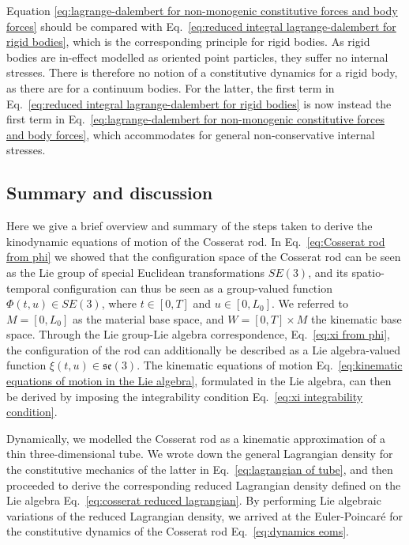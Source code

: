 Equation \ref{eq:lagrange-dalembert for non-monogenic constitutive forces and body forces} should be compared with Eq.~\ref{eq:reduced integral lagrange-dalembert for rigid bodies}, which is the corresponding principle for rigid bodies. As rigid bodies are in-effect modelled as oriented point particles, they suffer no internal stresses. There is therefore no notion of a constitutive dynamics for a rigid body, as there are for a continuum bodies. For the latter, the first term in Eq.~\ref{eq:reduced integral lagrange-dalembert for rigid bodies} is now instead the first term in Eq.~\ref{eq:lagrange-dalembert for non-monogenic constitutive forces and body forces}, which accommodates for general non-conservative internal stresses.


\subsection{Summary and discussion}

Here we give a brief overview and summary of the steps taken to derive the kinodynamic equations of motion of the Cosserat rod. In Eq.~\ref{eq:Cosserat rod from phi} we showed that the configuration space of the Cosserat rod can be seen as the Lie group of special Euclidean transformations $SE(3)$, and its spatio-temporal configuration can thus be seen as a group-valued function $\Phi(t,u) \in SE(3)$, where $t \in [0, T]$ and $u \in [0, L_0]$. We referred to $M = [0, L_0]$ as the material base space, and $W = [0, T] \times M$ the kinematic base space. Through the Lie group-Lie algebra correspondence, Eq.~\ref{eq:xi from phi}, the configuration of the rod can additionally be described as a Lie algebra-valued function $\xi(t,u) \in \mathfrak{se}(3)$. The kinematic equations of motion Eq.~\ref{eq:kinematic equations of motion in the Lie algebra}, formulated in the Lie algebra, can then be derived by imposing the integrability condition Eq.~\ref{eq:xi integrability condition}.

Dynamically, we modelled the Cosserat rod as a kinematic approximation of a thin three-dimensional tube. We wrote down the general Lagrangian density for the constitutive mechanics of the latter in Eq.~\ref{eq:lagrangian of tube}, and then proceeded to derive the corresponding reduced Lagrangian density defined on the Lie algebra Eq.~\ref{eq:cosserat reduced lagrangian}. By performing Lie algebraic variations of the reduced Lagrangian density, we arrived at the Euler-Poincaré for the constitutive dynamics of the Cosserat rod Eq.~\ref{eq:dynamics eoms}.

